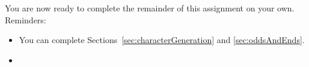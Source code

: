 \vspace{1cm}

You are now ready to complete the remainder of this assignment on your own.
Reminders:
\begin{itemize}
    \item You can complete Sections~\ref{sec:characterGeneration} and \ref{sec:oddsAndEnds}.
    \item \collaborationrules
\end{itemize}

